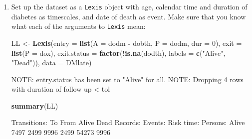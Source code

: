 \documentclass[
]{book}
\newenvironment{Shaded}{\begin{snugshade}}{\end{snugshade}}
\newcommand{\AttributeTok}[1]{\textcolor[rgb]{0.13,0.29,0.53}{#1}}
\newcommand{\DecValTok}[1]{\textcolor[rgb]{0.00,0.00,0.81}{#1}}
\newcommand{\FunctionTok}[1]{\textcolor[rgb]{0.13,0.29,0.53}{\textbf{#1}}}
\newcommand{\NormalTok}[1]{#1}
\newcommand{\OtherTok}[1]{\textcolor[rgb]{0.56,0.35,0.01}{#1}}
\newcommand{\SpecialCharTok}[1]{\textcolor[rgb]{0.81,0.36,0.00}{\textbf{#1}}}
\newcommand{\StringTok}[1]{\textcolor[rgb]{0.31,0.60,0.02}{#1}}
\begin{document}
\begin{enumerate}
\def\labelenumi{\arabic{enumi}.}
\item
  Set up the dataset as a \texttt{Lexis} object with age, calendar
  time and duration of diabetes as timescales, and date of death as
  event. Make sure that you know what each of the arguments to
  \texttt{Lexis} mean:

\begin{Shaded}
\begin{Highlighting}[]
\NormalTok{LL }\OtherTok{\textless{}{-}} \FunctionTok{Lexis}\NormalTok{(}\AttributeTok{entry =} \FunctionTok{list}\NormalTok{(}\AttributeTok{A =}\NormalTok{ dodm }\SpecialCharTok{{-}}\NormalTok{ dobth,}
                         \AttributeTok{P =}\NormalTok{ dodm,}
                       \AttributeTok{dur =} \DecValTok{0}\NormalTok{),}
             \AttributeTok{exit =} \FunctionTok{list}\NormalTok{(}\AttributeTok{P =}\NormalTok{ dox),}
      \AttributeTok{exit.status =} \FunctionTok{factor}\NormalTok{(}\SpecialCharTok{!}\FunctionTok{is.na}\NormalTok{(dodth),}
                           \AttributeTok{labels =} \FunctionTok{c}\NormalTok{(}\StringTok{"Alive"}\NormalTok{, }\StringTok{"Dead"}\NormalTok{)),}
             \AttributeTok{data =}\NormalTok{ DMlate)}
\end{Highlighting}
\end{Shaded}

\begin{Shaded}
\begin{Highlighting}[]
\NormalTok{NOTE: entry.status has been set to "Alive" for all.}
\NormalTok{NOTE: Dropping  4  rows with duration of follow up \textless{} tol}
\end{Highlighting}
\end{Shaded}

\begin{Shaded}
\begin{Highlighting}[]
\FunctionTok{summary}\NormalTok{(LL)}
\end{Highlighting}
\end{Shaded}

\begin{Shaded}
\begin{Highlighting}[]

\NormalTok{Transitions:}
\NormalTok{     To}
\NormalTok{From    Alive Dead Records: Events: Risk time: Persons:}
\NormalTok{  Alive  7497 2499     9996    2499      54273     9996}
\end{Highlighting}
\end{Shaded}


\end{enumerate}
\end{document}
